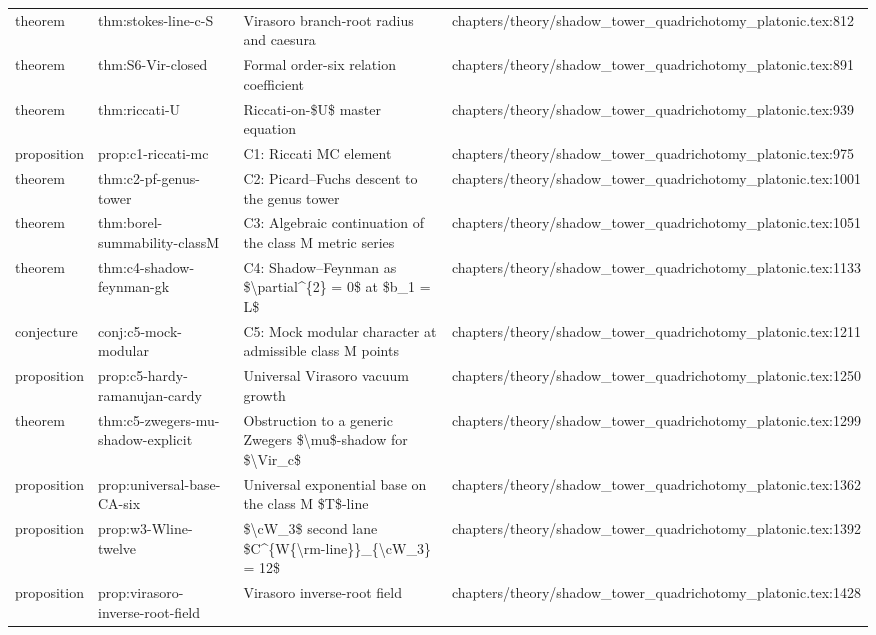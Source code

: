 \documentclass[11pt]{article}
\begin{document}
\begin{longtable}{L{0.10\textwidth}L{0.26\textwidth}L{0.42\textwidth}L{0.22\textwidth}}
theorem & thm:stokes-line-c-S & Virasoro branch-root radius and caesura & chapters/theory/shadow\_tower\_quadrichotomy\_platonic.tex:812\\
theorem & thm:S6-Vir-closed & Formal order-six relation coefficient & chapters/theory/shadow\_tower\_quadrichotomy\_platonic.tex:891\\
theorem & thm:riccati-U & Riccati-on-\$U\$ master equation & chapters/theory/shadow\_tower\_quadrichotomy\_platonic.tex:939\\
proposition & prop:c1-riccati-mc & C1: Riccati MC element & chapters/theory/shadow\_tower\_quadrichotomy\_platonic.tex:975\\
theorem & thm:c2-pf-genus-tower & C2: Picard--Fuchs descent to the genus tower & chapters/theory/shadow\_tower\_quadrichotomy\_platonic.tex:1001\\
theorem & thm:borel-summability-classM & C3: Algebraic continuation of the class M metric series & chapters/theory/shadow\_tower\_quadrichotomy\_platonic.tex:1051\\
theorem & thm:c4-shadow-feynman-gk & C4: Shadow--Feynman as \$\textbackslash{}partial\textasciicircum{}\{2\} = 0\$ at \$b\_1 = L\$ & chapters/theory/shadow\_tower\_quadrichotomy\_platonic.tex:1133\\
conjecture & conj:c5-mock-modular & C5: Mock modular character at admissible class M points & chapters/theory/shadow\_tower\_quadrichotomy\_platonic.tex:1211\\
proposition & prop:c5-hardy-ramanujan-cardy & Universal Virasoro vacuum growth & chapters/theory/shadow\_tower\_quadrichotomy\_platonic.tex:1250\\
theorem & thm:c5-zwegers-mu-shadow-explicit & Obstruction to a generic Zwegers \$\textbackslash{}mu\$-shadow for \$\textbackslash{}Vir\_c\$ & chapters/theory/shadow\_tower\_quadrichotomy\_platonic.tex:1299\\
proposition & prop:universal-base-CA-six & Universal exponential base on the class M \$T\$-line & chapters/theory/shadow\_tower\_quadrichotomy\_platonic.tex:1362\\
proposition & prop:w3-Wline-twelve & \$\textbackslash{}cW\_3\$ second lane \$C\textasciicircum{}\{W\{\textbackslash{}rm-line\}\}\_\{\textbackslash{}cW\_3\} = 12\$ & chapters/theory/shadow\_tower\_quadrichotomy\_platonic.tex:1392\\
proposition & prop:virasoro-inverse-root-field & Virasoro inverse-root field & chapters/theory/shadow\_tower\_quadrichotomy\_platonic.tex:1428\\

\end{longtable}
\end{document}
